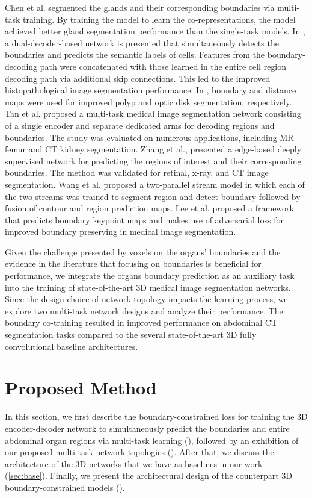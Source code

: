 \documentclass[final,5p,times,twocolumn]{elsarticle}
\begin{document}
Chen et al. \cite{chen2016dcan} segmented the glands and their corresponding boundaries via multi-task training. By training the model to learn the co-representations, the model achieved better gland segmentation performance than the single-task models. In \cite{Oda2018BESNetBS}, a dual-decoder-based network is presented that simultaneously detects the boundaries and predicts the semantic labels of cells. Features from the boundary-decoding path were concatenated with those learned in the entire cell region decoding path via additional skip connections. This led to the improved histopathological image segmentation performance. In \cite{Murugesan2019PsiNetSA}, boundary and distance maps were used for improved polyp and optic disk segmentation, respectively. Tan et al. \cite{8363791} proposed a multi-task medical image segmentation network consisting of a single encoder and separate dedicated arms for decoding regions and boundaries. The study was evaluated on numerous applications, including MR femur and CT kidney segmentation. Zhang et al., \cite{zhang2019net} presented a edge-based deeply supervised network for predicting the regions of interest and their corresponding boundaries. The method was validated for retinal, x-ray, and CT image segmentation. Wang et al. \cite{Wang2019AUT} proposed a two-parallel stream model in which each of the two streams was trained to segment region and detect boundary followed by fusion of contour and region prediction maps. Lee et al. \cite{Lee_2020_CVPR} proposed a framework that predicts boundary keypoint maps and makes use of adversarial loss for improved boundary preserving in medical image segmentation.

Given the challenge presented by voxels on the organs’ boundaries and the evidence in the literature that focusing on boundaries is beneficial for performance, we integrate the organs boundary prediction as an auxiliary task into the training of state-of-the-art 3D medical image segmentation networks. Since the design choice of network topology impacts the learning process, we explore two multi-task network designs and analyze their performance. The boundary co-training resulted in improved performance on abdominal CT segmentation tasks compared to the several state-of-the-art 3D fully convolutional baseline architectures.
\section{Proposed Method}\label{sec:method}
In this section, we first describe the boundary-constrained loss for training the 3D encoder-decoder network to simultaneously predict the boundaries and entire abdominal organ regions via multi-task learning (), followed by an exhibition of our proposed multi-task network topologies (). After that, we discuss the architecture of the 3D networks that we have as baselines in our work (\cref{sec:base}). Finally, we present the architectural design of the counterpart 3D boundary-constrained models ().
\end{document}
